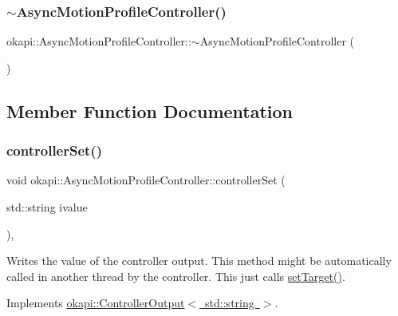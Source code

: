 \subsubsection{\texorpdfstring{$\sim$AsyncMotionProfileController()}{~AsyncMotionProfileController()}}
{\footnotesize\ttfamily okapi\+::\+Async\+Motion\+Profile\+Controller\+::$\sim$\+Async\+Motion\+Profile\+Controller (\begin{DoxyParamCaption}{ }\end{DoxyParamCaption})\hspace{0.3cm}{\ttfamily [override]}}



\subsection{Member Function Documentation}
\mbox{\label{classokapi_1_1AsyncMotionProfileController_a292b22f53ed0ef67a479e00c92f68e3f}} 
\subsubsection{\texorpdfstring{controllerSet()}{controllerSet()}}
{\footnotesize\ttfamily void okapi\+::\+Async\+Motion\+Profile\+Controller\+::controller\+Set (\begin{DoxyParamCaption}\item[{std\+::string}]{ivalue }\end{DoxyParamCaption})\hspace{0.3cm}{\ttfamily [override]}, {\ttfamily [virtual]}}

Writes the value of the controller output. This method might be automatically called in another thread by the controller. This just calls {\ttfamily \mbox{\hyperlink{classokapi_1_1AsyncMotionProfileController_adf705d6bfd3d0a83d8a6c50a05ffd156}{set\+Target()}}}. 

Implements \mbox{\hyperlink{classokapi_1_1ControllerOutput_a360c08f0c10b36f882d6d3100c2cad49}{okapi\+::\+Controller\+Output$<$ std\+::string $>$}}.

\mbox{\label{classokapi_1_1AsyncMotionProfileController_a74b2981453d36e01c30b66c522bdcb52}} 
